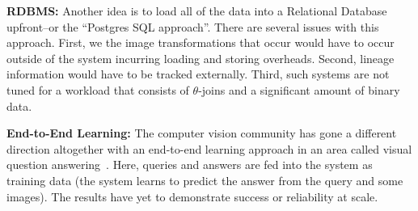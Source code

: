 \vspace{0.5em} \noindent \textbf{RDBMS: } Another idea is to load all of the data into a Relational Database upfront--or the ``Postgres SQL approach''. There are several issues with this approach. First, we the image transformations that occur would have to occur outside of the system incurring loading and storing overheads. Second, lineage information would have to be tracked externally. Third, such systems are not tuned for a workload that consists of $\theta$-joins and a significant amount of binary data.

\vspace{0.5em}  \noindent \textbf{End-to-End Learning: } The computer vision community has gone a different direction altogether with an end-to-end learning approach in an area called visual question answering~\cite{ganju2017s}. Here, queries and answers are fed into the system as training data (the system learns to predict the answer from the query and some images). The results have yet to demonstrate success or reliability at scale. 









